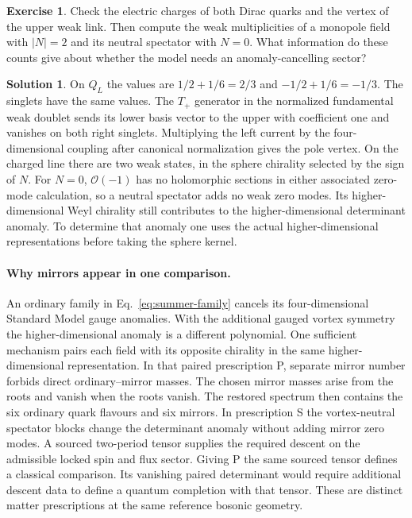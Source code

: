 \documentclass[10pt]{article}
\theoremstyle{definition}
\newtheorem{exercise}{Exercise}
\newtheorem{solution}{Solution}
\begin{document}
\begin{exercise}
Check the electric charges of both Dirac quarks and the vertex of the upper weak link. Then compute the weak multiplicities of a monopole field with \(|N|=2\) and its neutral spectator with \(N=0\). What information do these counts give about whether the model needs an anomaly-cancelling sector?
\end{exercise}

\begin{solution}
On \(Q_L\) the values are \(1/2+1/6=2/3\) and \(-1/2+1/6=-1/3\). The singlets have the same values. The \(T_+\) generator in the normalized fundamental weak doublet sends its lower basis vector to the upper with coefficient one and vanishes on both right singlets. Multiplying the left current by the four-dimensional coupling after canonical normalization gives the pole vertex. On the charged line there are two weak states, in the sphere chirality selected by the sign of \(N\). For \(N=0\), \(\mathcal O(-1)\) has no holomorphic sections in either associated zero-mode calculation, so a neutral spectator adds no weak zero modes. Its higher-dimensional Weyl chirality still contributes to the higher-dimensional determinant anomaly. To determine that anomaly one uses the actual higher-dimensional representations before taking the sphere kernel.
\end{solution}

\paragraph{Why mirrors appear in one comparison.} An ordinary family in Eq.~\eqref{eq:summer-family} cancels its four-dimensional Standard Model gauge anomalies. With the additional gauged vortex symmetry the higher-dimensional anomaly is a different polynomial. One sufficient mechanism pairs each field with its opposite chirality in the same higher-dimensional representation. In that paired prescription P, separate mirror number forbids direct ordinary--mirror masses. The chosen mirror masses arise from the roots and vanish when the roots vanish. The restored spectrum then contains the six ordinary quark flavours and six mirrors. In prescription S the vortex-neutral spectator blocks change the determinant anomaly without adding mirror zero modes. A sourced two-period tensor supplies the required descent on the admissible locked spin and flux sector. Giving P the same sourced tensor defines a classical comparison. Its vanishing paired determinant would require additional descent data to define a quantum completion with that tensor. These are distinct matter prescriptions at the same reference bosonic geometry.
\end{document}
